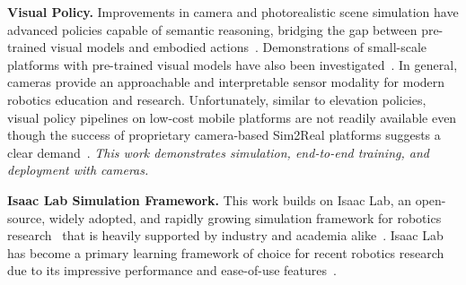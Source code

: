\textbf{Visual Policy.} Improvements in camera and photorealistic scene simulation have advanced policies capable of semantic reasoning, bridging the gap between pre-trained visual models and embodied actions~\cite{kang_generalization_2019, yuan_learning_2024}.
Demonstrations of small-scale platforms with pre-trained visual models have also been investigated~\cite{stachowicz_fastrlap_2023}. In general, cameras provide an approachable and interpretable sensor modality for modern robotics education and research. Unfortunately, similar to elevation policies, visual policy pipelines on low-cost mobile platforms are not readily available even though the success of proprietary camera-based Sim2Real platforms suggests a clear demand~\cite{balaji_deepracer_2020}. \textit{This work demonstrates simulation, end-to-end training, and deployment with cameras.}

\textbf{Isaac Lab Simulation Framework.} This work builds on Isaac Lab, an open-source, widely adopted, and rapidly growing simulation framework for robotics research~\cite{mittal_orbit_2023, liao_berkeley_2024} that is heavily supported by industry and academia alike~\cite{technologies_1x_nodate, noauthor_crossing_nodate, noauthor_get_nodate, noauthor_nvidia_nodate, noauthor_menteebot_nodate, liao_berkeley_2024}. Isaac Lab has become a primary learning framework of choice for recent robotics research due to its impressive performance and ease-of-use features~\cite{ma_eureka_2024, hoeller_anymal_2024, tao_maniskill3_2024, yang_agile_2024}.
